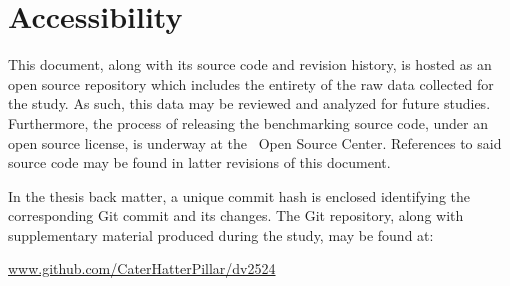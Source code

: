 \section*{Accessibility}
\label{sec:preface_accessibility}
This document, along with its source code and revision history, is hosted as an open source repository which includes the entirety of the raw data collected for the study.
As such, this data may be reviewed and analyzed for future studies.
Furthermore, the process of releasing the benchmarking source code, under an open source license, is underway at the \dvttermintel\ Open Source Center.
References to said source code may be found in latter revisions of this document.

In the thesis back matter, a unique commit hash is enclosed identifying the corresponding Git commit and its changes.
The Git repository, along with supplementary material produced during the study, may be found at:
\begin{center}
\href{https://github.com/CaterHatterPillar/dv2524}{www.github.com/CaterHatterPillar/dv2524}
\end{center}
